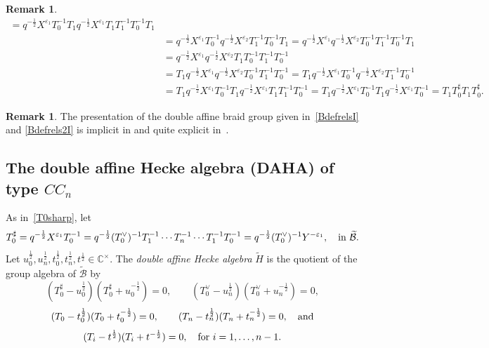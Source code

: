 \documentclass[11pt]{article}
\theoremstyle{plain}
\theoremstyle{definition}
\newtheorem{remark}[thm]{Remark}
\theoremstyle{remark}
\numberwithin{equation}{section}
\def\cB{\mathcal{B}}
\def\CC{\mathbb{C}}
\newcounter{r}
\newcounter{s}
\begin{document}
\begin{remark}
\begin{align*}
= q^{-\frac12}X^{\varepsilon_1}T_0^{-1}T_1 q^{-\frac12}X^{\varepsilon_1}T_1T_1^{-1}T_0^{-1} T_1 \\
&= q^{-\frac12}X^{\varepsilon_1}T_0^{-1} q^{-\frac12}X^{\varepsilon_2}T_1^{-1}T_0^{-1} T_1 
= q^{-\frac12}X^{\varepsilon_1} q^{-\frac12}X^{\varepsilon_2}T_0^{-1} T_1^{-1}T_0^{-1} T_1 \\
&= q^{-\frac12}X^{\varepsilon_1} q^{-\frac12}X^{\varepsilon_2}T_1T_0^{-1} T_1^{-1}T_0^{-1} \\
&= T_1 q^{-\frac12}X^{\varepsilon_1} q^{-\frac12}X^{\varepsilon_2}T_0^{-1} T_1^{-1}T_0^{-1} 
= T_1 q^{-\frac12}X^{\varepsilon_1} T_0^{-1} q^{-\frac12}X^{\varepsilon_2} T_1^{-1}T_0^{-1} \\
&= T_1 q^{-\frac12}X^{\varepsilon_1} T_0^{-1} T_1 q^{-\frac12}X^{\varepsilon_1} T_1 T_1^{-1}T_0^{-1} 
= T_1 q^{-\frac12}X^{\varepsilon_1} T_0^{-1} T_1 q^{-\frac12}X^{\varepsilon_1} T_0^{-1} 
= T_1 T_0^\sharp T_1 T_0^\sharp.
\end{align*}

\end{remark}



\begin{remark}
The presentation of the double affine braid group given in~\eqref{BdefrelsI} and
\eqref{Bdefrels2I} is implicit in 
\cite[Cor.\ 4.18]{H06} and quite explicit in~\cite[Theorem 3.11]{IS03}.
\end{remark}



 
\subsection{The double affine Hecke algebra (DAHA) of type $CC_n$}


As in~\eqref{T0sharp}, let
$$T_0^\sharp = q^{-\frac12}X^{\varepsilon_1}T_0^{-1}
= q^{-\frac12}(T_0^{\vee})^{-1}T_1^{-1}\cdots T_n^{-1}\cdots T_1^{-1}T_0^{-1}
=q^{-\frac12} (T_0^{\vee})^{-1}Y^{-\varepsilon_1},
\quad\hbox{in $\widetilde{\cB}$.}
$$ 
Let $u_0^{\frac12}, u_n^{\frac12}, t_0^{\frac12}, t_n^{\frac12}, t^{\frac12}\in \CC^\times$.
The \emph{double affine Hecke algebra} $\widetilde{H}$ is the quotient of the group algebra of
$\widetilde{\cB}$ by
$$
(T_0^\sharp - u_0^{\frac12})(T_0^\sharp+u_0^{-\frac12}) = 0,
\qquad
(T_0^{\vee} - u_n^{\frac12})(T_0^{\vee} +u_n^{-\frac12}) = 0,
$$
\begin{equation}
(T_0 - t_0^{\frac12})(T_0+t_0^{-\frac12}) = 0,
\qquad
(T_n - t_n^{\frac12})(T_n +t_n^{-\frac12}) = 0,
\quad\hbox{and}
\label{DHeckedefnI}
\end{equation}
$$
(T_i - t^{\frac12})(T_i+t^{-\frac12}) = 0,\quad\hbox{for $i=1,\ldots, n-1$.}
$$
\end{document}
